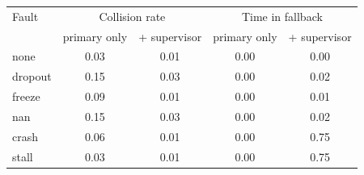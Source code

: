 \begin{tabular}{@{}lcccc@{}}
\toprule
Fault & \multicolumn{2}{c}{Collision rate} & \multicolumn{2}{c}{Time in fallback} \\
 & primary only & + supervisor & primary only & + supervisor \\
\midrule
none & 0.03 & 0.01 & 0.00 & 0.00 \\
dropout & 0.15 & 0.03 & 0.00 & 0.02 \\
freeze & 0.09 & 0.01 & 0.00 & 0.01 \\
nan & 0.15 & 0.03 & 0.00 & 0.02 \\
crash & 0.06 & 0.01 & 0.00 & 0.75 \\
stall & 0.03 & 0.01 & 0.00 & 0.75 \\
\bottomrule
\end{tabular}
